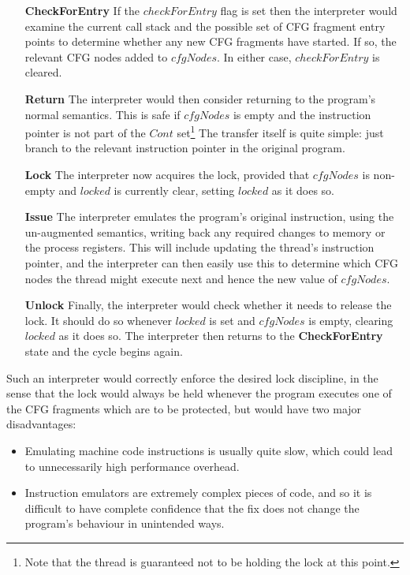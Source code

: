 \begin{itemize}
\item[\textbf{CheckForEntry}] If the $checkForEntry$ flag is set then the
  interpreter would examine the current call stack and the possible
  set of CFG fragment entry points to determine whether any new CFG
  fragments have started.  If so, the relevant CFG nodes added to
  $\mathit{cfgNodes}$.  In either case, $checkForEntry$ is cleared.
\item[\textbf{Return}] The interpreter would then consider returning
  to the program's normal semantics.  This is safe if $\mathit{cfgNodes}$ is
  empty and the instruction pointer is not part of the $Cont$
  set\footnote{Note that the thread is guaranteed not to be holding
    the lock at this point.}  The transfer itself is quite simple:
  just branch to the relevant instruction pointer in the original
  program.
\item[\textbf{Lock}] The interpreter now acquires the lock, provided
  that $\mathit{cfgNodes}$ is non-empty and $locked$ is currently clear,
  setting $locked$ as it does so.
\item[\textbf{Issue}] The interpreter emulates the program's original
  instruction, using the un-augmented semantics, writing back any
  required changes to memory or the process registers.  This will
  include updating the thread's instruction pointer, and the
  interpreter can then easily use this to determine which CFG nodes
  the thread might execute next and hence the new value of $\mathit{cfgNodes}$.
\item[\textbf{Unlock}] Finally, the interpreter would check whether it
  needs to release the lock.  It should do so whenever $locked$ is set
  and $\mathit{cfgNodes}$ is empty, clearing $locked$ as it does so.  The
  interpreter then returns to the \textbf{CheckForEntry} state and the
  cycle begins again.
\end{itemize}
  
Such an interpreter would correctly enforce the desired lock
discipline, in the sense that the lock would always be held whenever
the program executes one of the CFG fragments which are to be
protected, but would have two major disadvantages:

\begin{itemize}
\item Emulating machine code instructions is usually quite slow, which
  could lead to unnecessarily high performance overhead.
\item Instruction emulators are extremely complex pieces of code, and
  so it is difficult to have complete confidence that the fix does not
  change the program's behaviour in unintended ways.
\end{itemize}

